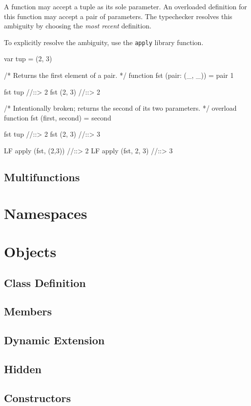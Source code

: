 \documentclass[11pt]{article}
\newcommand{\literal}[1]{\lstinline[style=DSL,identifierstyle=\itshape]!#1!}
\newcommand{\keyword}[1]{\literal{#1}}
\begin{document}
A function may accept a tuple as its sole parameter. 
An overloaded definition for this function may accept a pair of parameters.
The typechecker resolves this ambiguity by choosing the \emph{most recent} definition.

To explicitly resolve the ambiguity, use the \keyword{apply} library function.

\begin{dsl}
var tup = (2, 3)

/* Returns the first element of a pair. */
function fst (pair: (_, _)) = pair 1

fst tup //::> 2
fst (2, 3) //::> 2

/* Intentionally broken; returns the second of its two parameters. */
overload function fst (first, second) = second

fst tup //::> 2
fst (2, 3) //::> 3

LF apply (fst, (2,3)) //::> 2
LF apply (fst, 2, 3) //::> 3
\end{dsl}


\subsection{Multifunctions}

\newpage
\section{Namespaces}
\newpage
\section {Objects}
\subsection{Class Definition}
\subsection{Members}
\subsection{Dynamic Extension}
\subsection{Hidden}
\subsection{Constructors}
\end{document}
